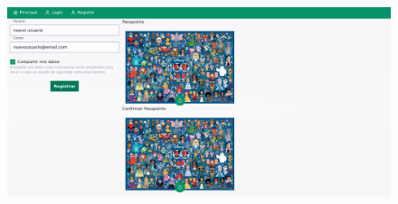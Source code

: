 \begin{anexos}
\begin{figure}[H]
	\centering
	\begin{minipage}[b]{0.68\linewidth}  %
		\centering
		\includegraphics[width=\linewidth]{Graphics/capturas/full-screen disney-password.png}
	

\end{minipage}
\end{figure}
\end{anexos}
